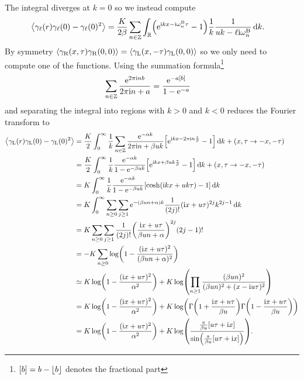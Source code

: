 \documentclass[english, parskip=full]{scrartcl}
\begin{document}
The integral diverges at $k=0$ so we instead compute
\begin{align}
\bra*{\gamma_\ell(r) \gamma_{\ell}(0) - \gamma_\ell(0)^2} &= \frac{K}{2\beta} \sum_{n\in\mathbb{Z}} \intr{\kla*{\powe{\i kx - \i\omega_n^\B\tau} - 1} \frac{1}{k} \frac{1}{uk - \ell\i\omega_n^\B}}{k}.
\end{align}
By symmetry $\bra*{\gamma_\R(x,\tau) \gamma_\R(0,0)} = \bra*{\gamma_\L(x,-\tau)\gamma_\L(0,0)}$ so we only need to compute one of the functions.
Using the summation formula\footnote{$\klb*{b} = b - \lfloor b \rfloor$ denotes the fractional part}
\begin{align}
\sum_{n\in\mathbb{Z}} \frac{\powe{2\pi \i n b}}{2\pi\i n + a} &= \frac{\powe{-a\klb*{b}}}{1 - \powe{-a}}
\end{align}
and separating the integral into regions with $k>0$ and $k<0$ reduces the Fourier transform to
\begin{align}
\bra*{\gamma_\L(r) \gamma_{\L}(0) - \gamma_\L(0)^2} &= \frac{K}{2} \intx{0}{\infty}{\frac{1}{k} \sum_{n\in\mathbb{Z}} \frac{\powe{-\alpha k}}{2\pi \i n + \beta uk} \klb*{\powe{\i kx - 2\pi\i n \frac{\tau}{\beta} } - 1} }{k} + (x,\tau\rightarrow -x,-\tau)\\
&= \frac{K}{2} \intx{0}{\infty}{\frac{1}{k} \frac{\powe{-\alpha k}}{1 - \powe{-\beta uk}} \klb*{\powe{\i kx + \beta uk \frac{\tau}{\beta}} - 1 }}{k} + (x,\tau\rightarrow -x,-\tau)\\
&= K \intx{0}{\infty}{\frac{1}{k} \frac{\powe{-\alpha k}}{1 - \powe{-\beta uk}} \klb*{\cosh\kla*{\i kx + uk\tau} - 1} }{k}\\
&= K\intx{0}{\infty}{\sum_{n\ge 0} \sum_{j\ge 1} \powe{-(\beta un + \alpha) k} \frac{1}{(2j)!} (\i x+u\tau)^{2j} k^{2j-1} }{k}\\
&= K \sum_{n\ge 0} \sum_{j\ge 1} \frac{1}{(2j)!} \kla*{\frac{\i x+u\tau}{\beta un + \alpha}}^{2j} (2j-1)!\\
&= -K \sum_{n\ge 0} \log\kla*{1 - \frac{(\i x+u\tau)^2}{(\beta un + \alpha)^2}}\\
&\simeq K\log\kla*{1 - \frac{(\i x + u\tau)^2}{\alpha^2}} + K \log\kla*{\prod_{n\ge 1} \frac{(\beta un)^2}{(\beta un)^2 + (x - \i u\tau)^2}} \\
&= K\log\kla*{1 - \frac{(\i x + u\tau)^2}{\alpha^2}} + K \log\kla*{\Gamma\kla*{1 + \frac{\i x + u\tau}{\beta u}} \Gamma\kla*{1 - \frac{\i x + u\tau}{\beta u}}}\\
&= K\log\kla*{1 - \frac{(\i x + u\tau)^2}{\alpha^2}} + K \log \kla*{\frac{\frac{\pi}{\beta u} \klb*{u\tau + \i x}}{\sin\kla*{\frac{\pi}{\beta u} \klb*{u\tau + \i x}}}}.
\end{align}
\end{document}
